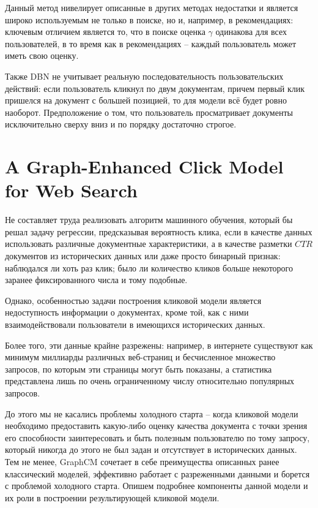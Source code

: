 \documentclass[diploma]{nanolab2015}
\begin{document}
Данный метод нивелирует описанные в других методах недостатки и является широко используемым не только в поиске, но и, например, в рекомендациях: ключевым отличием является то, что в поиске оценка $\gamma$ одинакова для всех пользователей, в то время как в рекомендациях -- каждый пользователь может иметь свою оценку.

Также DBN не учитывает реальную последовательность пользовательских действий: если пользователь кликнул по двум документам, причем первый клик пришелся на документ с большей позицией, то для модели всё будет ровно наоборот. Предположение о том, что пользователь просматривает документы исключительно сверху вниз и по порядку достаточно строгое.

\section{A Graph-Enhanced Click Model for Web Search}
Не составляет труда реализовать алгоритм машинного обучения, который бы решал задачу регрессии, предсказывая вероятность клика, если в качестве данных использовать различные документные характеристики, а в качестве разметки $CTR$ документов из исторических данных или даже просто бинарный признак: наблюдался ли хоть раз клик; было ли количество кликов больше некоторого заранее фиксированного числа и тому подобные.

Однако, особенностью задачи построения кликовой модели является недоступность информации о документах, кроме той, как с ними взаимодействовали пользователи в имеющихся исторических данных.

Более того, эти данные крайне разрежены: например, в интернете существуют как минимум миллиарды различных веб-страниц и бесчисленное множество запросов, по которым эти страницы могут быть показаны, а статистика представлена лишь по очень ограниченному числу относительно популярных запросов.

До этого мы не касались проблемы холодного старта -- когда кликовой модели необходимо предоставить какую-либо оценку качества документа с точки зрения его способности заинтересовать и быть полезным пользователю по тому запросу, который никогда до этого не был задан и отсутствует в исторических данных. Тем не менее, GraphCM \cite{GraphCM} сочетает в себе преимущества описанных ранее классический моделей, эффективно работает с разреженными данными и борется с проблемой холодного старта. Опишем подробнее компоненты данной модели и их роли в построении результирующей кликовой модели.
\end{document}
